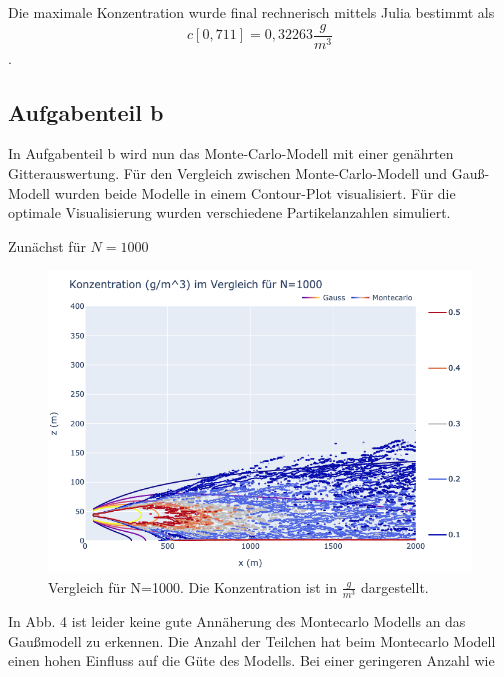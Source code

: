 \documentclass[ngerman]{scrartcl}
\begin{document}
Die maximale Konzentration wurde final rechnerisch mittels Julia bestimmt als
\begin{equation}
	c[0,711] = 0,32263  \frac{g}{m^3}
\end{equation}
.

\subsection{Aufgabenteil b}
In Aufgabenteil b wird nun das Monte-Carlo-Modell mit einer genährten Gitterauswertung.
Für den Vergleich zwischen Monte-Carlo-Modell und Gauß-Modell wurden beide Modelle in einem Contour-Plot visualisiert.  Für die optimale Visualisierung wurden verschiedene Partikelanzahlen simuliert.

Zunächst für $N=1000$
\begin{figure}[H]
	\centering
	\includegraphics[scale=0.5]{Bilder/1b1k.png}
	\caption{Vergleich für N=1000. Die Konzentration ist in $\frac{\si{g}}{\si{m^3}}$ dargestellt.}
	\label{fig:my_label}
\end{figure}
In Abb. 4 ist leider keine gute Annäherung des Montecarlo Modells an das Gaußmodell zu erkennen. Die Anzahl der Teilchen hat beim Montecarlo Modell einen hohen Einfluss auf die Güte des Modells. Bei einer geringeren Anzahl wie 
\end{document}
